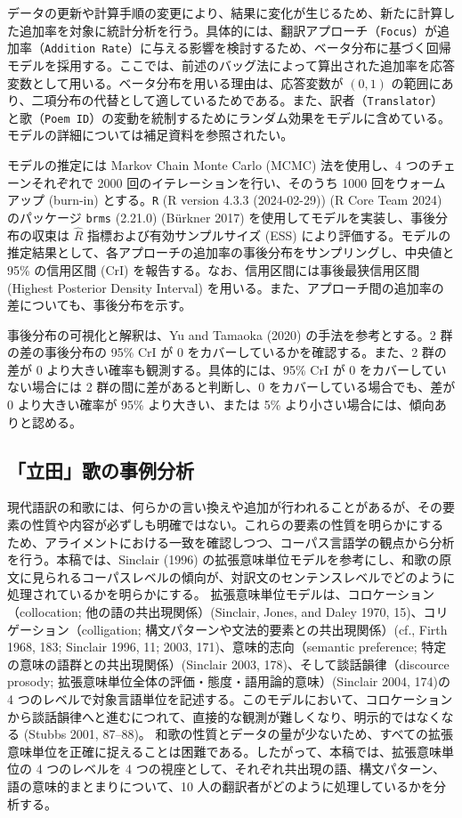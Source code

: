 \documentclass[
  letterpaper,
  DIV=11,
  numbers=noendperiod]{scrartcl}
\begin{document}
データの更新や計算手順の変更により、結果に変化が生じるため、新たに計算した追加率を対象に統計分析を行う。具体的には、翻訳アプローチ（\texttt{Focus}）が追加率（\texttt{Addition\ Rate}）に与える影響を検討するため、ベータ分布に基づく回帰モデルを採用する。ここでは、前述のバッグ法によって算出された追加率を応答変数として用いる。ベータ分布を用いる理由は、応答変数が
\((0, 1)\)
の範囲にあり、二項分布の代替として適しているためである。また、訳者（\texttt{Translator}）と歌（\texttt{Poem\ ID}）の変動を統制するためにランダム効果をモデルに含めている。モデルの詳細については補足資料を参照されたい。

モデルの推定には Markov Chain Monte Carlo (MCMC) 法を使用し、4
つのチェーンそれぞれで 2000 回のイテレーションを行い、そのうち 1000
回をウォームアップ (burn-in) とする。\texttt{R} (R version 4.3.3
(2024-02-29)) (R Core Team 2024) のパッケージ \texttt{brms} (2.21.0)
(Bürkner 2017) を使用してモデルを実装し、事後分布の収束は \(\hat{R}\)
指標および有効サンプルサイズ (ESS)
により評価する。モデルの推定結果として、各アプローチの追加率の事後分布をサンプリングし、中央値と
95\% の信用区間 (CrI) を報告する。なお、信用区間には事後最狭信用区間
(Highest Posterior Density Interval)
を用いる。また、アプローチ間の追加率の差についても、事後分布を示す。

事後分布の可視化と解釈は、Yu and Tamaoka (2020) の手法を参考とする。2
群の差の事後分布の 95\% CrI が 0 をカバーしているかを確認する。また、2
群の差が 0 より大きい確率も観測する。具体的には、95\% CrI が 0
をカバーしていない場合には 2 群の間に差があると判断し、0
をカバーしている場合でも、差が 0 より大きい確率が 95\%
より大きい、または 5\% より小さい場合には、傾向ありと認める。

\subsection{「立田」歌の事例分析}\label{ux7acbux7530ux6b4cux306eux4e8bux4f8bux5206ux6790}

現代語訳の和歌には、何らかの言い換えや追加が行われることがあるが、その要素の性質や内容が必ずしも明確ではない。これらの要素の性質を明らかにするため、アライメントにおける一致を確認しつつ、コーパス言語学の観点から分析を行う。本稿では、Sinclair
(1996)
の拡張意味単位モデルを参考にし、和歌の原文に見られるコーパスレベルの傾向が、対訳文のセンテンスレベルでどのように処理されているかを明らかにする。
拡張意味単位モデルは、コロケーション（collocation;
他の語の共出現関係）(Sinclair, Jones, and Daley 1970,
15)、コリゲーション（colligation;
構文パターンや文法的要素との共出現関係）(cf., Firth 1968, 183; Sinclair
1996, 11; 2003, 171)、意味的志向（semantic preference;
特定の意味の語群との共出現関係）(Sinclair 2003,
178)、そして談話韻律（discource prosody;
拡張意味単位全体の評価・態度・語用論的意味）(Sinclair 2004, 174)の 4
つのレベルで対象言語単位を記述する。このモデルにおいて、コロケーションから談話韻律へと進むにつれて、直接的な観測が難しくなり、明示的ではなくなる
(Stubbs 2001, 87--88)。
和歌の性質とデータの量が少ないため、すべての拡張意味単位を正確に捉えることは困難である。したがって、本稿では、拡張意味単位の
4 つのレベルを 4
つの視座として、それぞれ共出現の語、構文パターン、語の意味的まとまりについて、10
人の翻訳者がどのように処理しているかを分析する。
\end{document}
